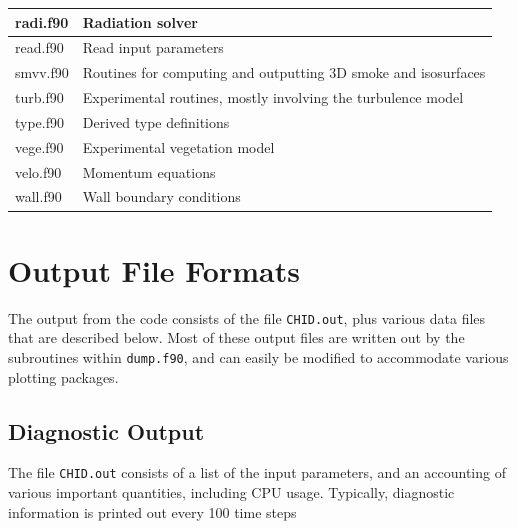 \documentclass[11pt]{book}
\newcommand{\ct}{\tt\small}
\begin{document}
\begin{table}[ht]
\begin{center}
\begin{tabular}{|l|l|}
radi.f90   & Radiation solver  \\ \hline
read.f90   & Read input parameters \\ \hline
smvv.f90   & Routines for computing and outputting 3D smoke and isosurfaces \\ \hline
turb.f90   & Experimental routines, mostly involving the turbulence model \\ \hline
type.f90   & Derived type definitions \\ \hline
vege.f90   & Experimental vegetation model \\ \hline
velo.f90   & Momentum equations \\ \hline
wall.f90   & Wall boundary conditions \\ \hline
\end{tabular}
\end{center}
\end{table}





\chapter{Output File Formats}

The output from the code consists of the file {\ct CHID.out}, plus various
data files that are described below.
Most of these output files are written out by the subroutines within {\ct dump.f90},
and can easily be modified to accommodate various plotting packages.

\section{Diagnostic Output}

\label{out:file}

The file {\ct CHID.out} consists of a list of the input
parameters, and an accounting of various important quantities, including
CPU usage. Typically, diagnostic information is printed out every
100 time steps
\end{document}
